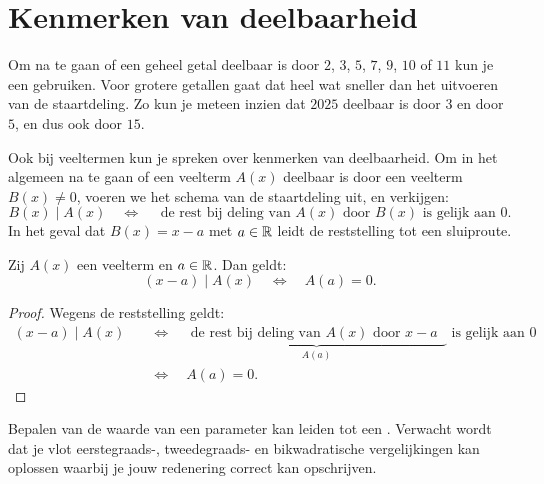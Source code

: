 \documentclass{ximera}
\begin{document}
	\author{Koen De Naeghel}
	\label{xim:veeltermen_kenmerken_van_deelbaarheid}

\section{Kenmerken van deelbaarheid} 

Om na te gaan of een geheel getal deelbaar is door $2$, $3$, $5$, $7$, $9$, $10$ of $11$ kun je een  gebruiken. Voor grotere getallen gaat dat heel wat sneller dan het uitvoeren van de staartdeling. Zo kun je meteen inzien dat $2025$ deelbaar is door $3$ en door $5$, en dus ook door $15$.  

Ook bij veeltermen kun je spreken over kenmerken van deelbaarheid. Om in het algemeen na te gaan of een veelterm $A(x)$ deelbaar is door een veelterm $B(x) \neq 0$, voeren we het schema van de staartdeling uit, en verkijgen:
\[
B(x) \mid A(x) \quad \Leftrightarrow \quad \text{ de rest bij deling van $A(x)$ door $B(x)$ is gelijk aan $0$.}
\] 
In het geval dat $B(x) = x-a$ met $a \in \mathbb{R}$ leidt de reststelling tot een sluiproute.

\begin{stelling}\label{stelling:kenmerkvandeelbaarheid}
Zij $A(x)$ een veelterm en $a \in \mathbb{R}$. Dan geldt:
\[
(x-a) \mid A(x) \quad \Leftrightarrow \quad A(a) = 0.
\]
\end{stelling}
\begin{proof}
Wegens de reststelling geldt:
\begin{align}
(x-a) \mid A(x) \quad 
& \Leftrightarrow \quad \underbrace{\text{ de rest bij deling van $A(x)$ door $x-a$ }}_{A(a)} \text{ is gelijk aan $0$} \nonumber \\
& \Leftrightarrow \quad A(a) = 0. \tag*{\qedhere}
\end{align}
\end{proof}

Bepalen van de waarde van een parameter kan leiden tot een . Verwacht wordt dat je vlot eerstegraads-, tweedegraads- en bikwadratische vergelijkingen kan oplossen waarbij je jouw redenering correct kan opschrijven. 
\end{document}
